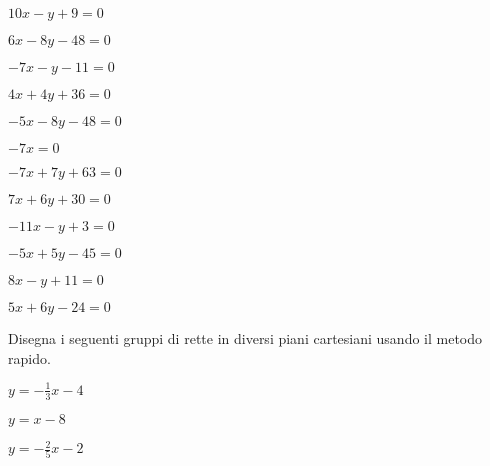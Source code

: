 \begin{esercizio}\label{ese:}
 \begin{multicols}{3}
 \begin{enumeratea}
  \item  $10 x - y + 9 = 0$
  \item  $6 x - 8 y - 48 = 0$
  \item  $-7 x - y - 11 = 0$
 \end{enumeratea}
 \end{multicols}
\end{esercizio}

\begin{esercizio}\label{ese:}
 \begin{multicols}{3}
 \begin{enumeratea}
  \item  $4 x + 4 y + 36 = 0$
  \item  $-5 x - 8 y - 48 = 0$
  \item  $-7 x = 0$
 \end{enumeratea}
 \end{multicols}
\end{esercizio}

\begin{esercizio}\label{ese:}
 \begin{multicols}{3}
 \begin{enumeratea}
  \item  $-7 x + 7 y + 63 = 0$
  \item  $7 x + 6 y + 30 = 0$
  \item  $-11 x - y + 3 = 0$
 \end{enumeratea}
 \end{multicols}
\end{esercizio}

\begin{esercizio}\label{ese:}
 \begin{multicols}{3}
 \begin{enumeratea}
  \item  $-5 x + 5 y - 45 = 0$
  \item  $8 x - y + 11 = 0$
  \item  $5 x + 6 y - 24 = 0$
 \end{enumeratea}
 \end{multicols}
\end{esercizio}

Disegna i seguenti gruppi di rette in diversi 
piani cartesiani usando il metodo rapido.

\begin{esercizio}\label{ese:}
 \begin{multicols}{3}
 \begin{enumeratea}
  \item  $y = -\frac{1}{3} x -4$
  \item  $y = x -8$
  \item  $y = -\frac{2}{5} x -2$
 \end{enumeratea}
 \end{multicols}
\end{esercizio}

